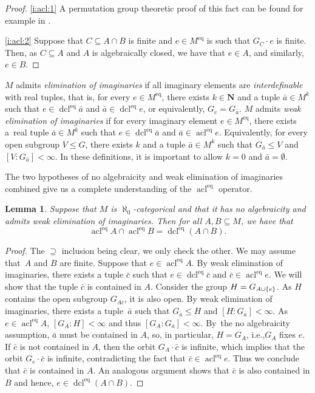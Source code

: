 \documentclass[11pt]{article}
\newcommand{\ie}{i.e.,\xspace}
\newcommand{\skpt}{\smallskip}
\let\sub\subseteq
\theoremstyle{plain}
\newtheorem{lemma}[theorem]{Lemma}
\theoremstyle{definition}
\newcommand{\N}{{\mathbf N}}
\DeclareMathOperator{\acl}{acl}
\DeclareMathOperator{\dcl}{dcl}
\DeclarePairedDelimiter\set{\{}{\}}
\newcommand{\eq}{^{\mathrm{eq}}}
\begin{document}
\skpt
\begin{proof}
\eqref{i:acl:1} A permutation group theoretic proof of this fact can be found for example in \cite[Lem.\,2.4]{Evans2016}.

\eqref{i:acl:2} Suppose that $C \sub A \cap B$ is finite and $e \in M\eq$ is such that $G_C \cdot e$ is finite. Then, as $C \sub A$ and $A$ is algebraically closed, we have that $e \in A$, and similarly, $e \in B$.
\end{proof}

$M$ admits \emph{elimination of imaginaries} if all imaginary elements are \emph{interdefinable} with real tuples, that is, for every $e \in M\eq$, there exists $k \in \N$ and a tuple $\bar a \in M^k$ such that $e \in \dcl\eq \bar a$ and $\bar a \in \dcl\eq e$, or equivalently, $G_e = G_{\bar a}$. $M$ admits \emph{weak elimination of imaginaries} if for every imaginary element $e \in M\eq$, there exists a~real tuple $\bar a \in M^k$ such that $e \in \dcl\eq \bar a$ and $\bar a \in \acl\eq e$. Equivalently, for every open subgroup $V \leq G$, there exists $k$ and a tuple $\bar a \in M^k$ such that $G_{\bar a} \leq V$ and $[V : G_{\bar a}] < \infty$. In these definitions, it is important to allow $k = 0$ and $\bar a = \emptyset$.

The two hypotheses of no algebraicity and weak elimination of imaginaries combined give us a complete understanding of the $\acl\eq$ operator.
\begin{lemma}
\label{l:no-algeb-and-welim}
Suppose that $M$ is $\aleph_0$-categorical and that it has no algebraicity and admits weak elimination of imaginaries. Then for all $A, B \sub M$, we have that
\begin{equation*}
\acl\eq A \cap \acl\eq B = \dcl\eq (A \cap B).
\end{equation*}
\end{lemma}
\begin{proof}
The $\supseteq$ inclusion being clear, we only check the other. We may assume that~$A$ and $B$ are finite. Suppose that $e \in \acl\eq A$. By weak elimination of imaginaries, there exists a tuple $\bar c$ such that $e \in \dcl\eq \bar c$ and $\bar c \in \acl\eq e$. We will show that the tuple $\bar c$ is contained in $A$. Consider the group $H = G_{A \cup \set{e}}$. As $H$ contains the open subgroup $G_{A \bar c}$, it is also open. By weak elimination of imaginaries, there exists a tuple~$\bar a$ such that $G_{\bar a} \leq H$ and $[H : G_{\bar a}] < \infty$. As $e \in \acl\eq A$, $[G_A : H] < \infty$ and thus $[G_A : G_{\bar a}] < \infty$. By~the no algebraicity assumption, $\bar a$ must be contained in $A$, so, in particular, $H = G_A$, \ie $G_A$ fixes $e$. If $\bar c$ is not contained in $A$, then the orbit $G_A \cdot \bar c$ is infinite, which implies that the orbit $G_e \cdot \bar c$ is infinite, contradicting the fact that $\bar c \in \acl\eq e$. Thus we conclude that $\bar c$ is contained in $A$. An analogous argument shows that $\bar c$ is also contained in $B$ and hence, $e \in \dcl\eq (A \cap B)$.
\end{proof}
\end{document}
